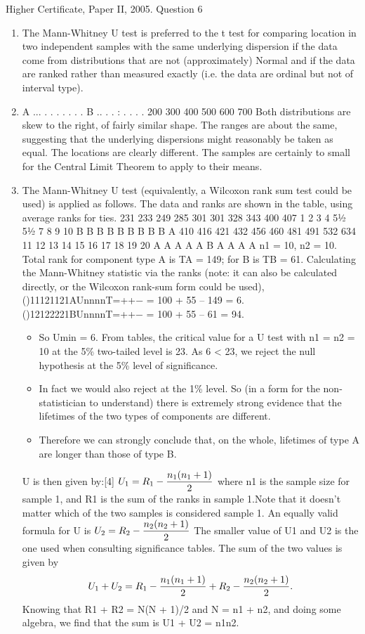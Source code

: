 \documentclass[a4paper,12pt]{article}
\begin{document}
Higher Certificate, Paper II, 2005. Question 6
\begin{enumerate}
\item The Mann-Whitney U test is preferred to the t test for comparing location in two independent samples with the same underlying dispersion if the data come from distributions that are not (approximately) Normal and if the data are ranked rather than measured exactly (i.e. the data are ordinal but not of interval type).
\item
A
... . . . . .
.
.
B
.. . .
: . .
. .
200 300 400 500 600 700
Both distributions are skew to the right, of fairly similar shape. The ranges are about the same, suggesting that the underlying dispersions might reasonably be taken as equal. The locations are clearly different. The samples are certainly to small for the Central Limit Theorem to apply to their means.
\item The Mann-Whitney U test (equivalently, a Wilcoxon rank sum test could be used) is applied as follows. The data and ranks are shown in the table, using average ranks for ties.
231
233
249
285
301
301
328
343
400
407
1
2
3
4
5½
5½
7
8
9
10
B
B
B
B
B
B
B
B
B
A
410
416
421
432
456
460
481
491
532
634
11
12
13
14
15
16
17
18
19
20
A
A
A
A
A
B
A
A
A
A
n1 = 10, n2 = 10. Total rank for component type A is TA = 149; for B is TB = 61.
Calculating the Mann-Whitney statistic via the ranks (note: it can also be calculated directly, or the Wilcoxon rank-sum form could be used),
()11121121AUnnnnT=++− = 100 + 55 – 149 = 6.
()12122221BUnnnnT=++− = 100 + 55 – 61 = 94.
\begin{itemize}
\item So Umin = 6. From tables, the critical value for a U test with n1 = n2 = 10 at the 5\% two-tailed level is 23. As 6 < 23, we reject the null hypothesis at the 5\% level of significance.
\item In fact we would also reject at the 1\% level. So (in a form for the non-statistician to understand) there is extremely strong evidence that the lifetimes of the two types of components are different. 
\item Therefore we can strongly conclude that, on the whole, lifetimes of type A are longer than those of type B.
\end{itemize}

\begin{framed}

U is then given by:[4]
$ {\displaystyle U_{1}=R_{1}-{n_{1}(n_{1}+1) \over 2}\,\!}  $ 
where n1 is the sample size for sample 1, and R1 is the sum of the ranks in sample 1.Note that it doesn't matter which of the two samples is considered sample 1. An equally valid formula for U is
${\displaystyle U_{2}=R_{2}-{n_{2}(n_{2}+1) \over 2}\,\!} $
The smaller value of U1 and U2 is the one used when consulting significance tables. The sum of the two values is given by \[ {\displaystyle U_{1}+U_{2}=R_{1}-{n_{1}(n_{1}+1) \over 2}+R_{2}-{n_{2}(n_{2}+1) \over 2}.\,\!}\] 
Knowing that R1 + R2 = N(N + 1)/2 and N = n1 + n2, and doing some algebra, we find that the sum is U1 + U2 = n1n2.
\end{framed}
\end{enumerate}
\end{document}
